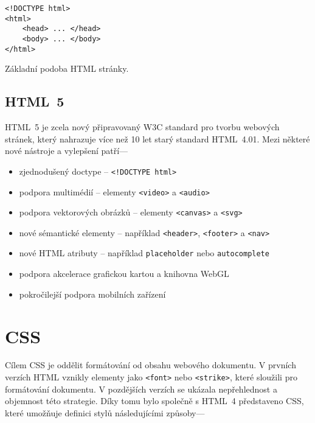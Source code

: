 \begin{example}
    \centering
    \begin{lstlisting}
<!DOCTYPE html>
<html>
    <head> ... </head>
    <body> ... </body>
</html>
    \end{lstlisting}
    \caption{Základní podoba HTML stránky.}
    \label{example:html}
\end{example}

\subsection{HTML~5}

HTML~5 je zcela nový připravovaný W3C standard pro tvorbu webových stránek, který nahrazuje více než 10 let starý standard HTML~4.01. Mezi některé nové nástroje a vylepšení patří---

\begin{itemize}
    \item zjednodušený doctype -- \texttt{<!DOCTYPE html>}
    \item podpora multimédií -- elementy \texttt{<video>} a \texttt{<audio>}
    \item podpora vektorových obrázků -- elementy \texttt{<canvas>} a \texttt{<svg>}
    \item nové sémantické elementy -- například \texttt{<header>}, \texttt{<footer>} a \texttt{<nav>}
    \item nové HTML atributy -- například \texttt{placeholder} nebo \texttt{autocomplete}
    \item podpora akcelerace grafickou kartou a knihovna WebGL\footnotemark[1]
    \item pokročilejší podpora mobilních zařízení
\end{itemize}


\section{CSS}
\label{sec:css}

Cílem CSS je oddělit formátování od obsahu webového dokumentu. V prvních verzích HTML vznikly elementy jako \texttt{<font>} nebo \texttt{<strike>}, které sloužili pro formátování dokumentu. V pozdějších verzích se ukázala nepřehlednost a objemnost této strategie. Díky tomu bylo společně s HTML~4 představeno CSS, které umožňuje definici stylů následujícími způsoby---

